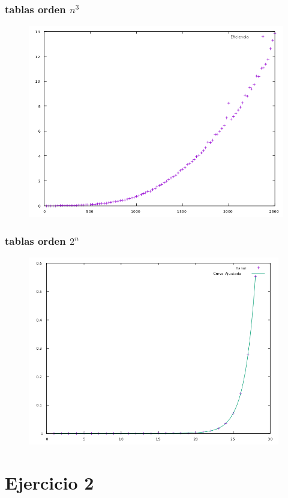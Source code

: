 \documentclass[compress]{beamer}
\begin{document}
\begin{frame}
\frametitle{tablas orden $n^3$}
	\begin{figure}
  \centering
    \includegraphics[width=1\textwidth]{Floyd.png}
  \label{fig:ejemplo}
\end{figure}
\end{frame}
\begin{frame}
\frametitle{tablas orden $2^n$}
	\begin{figure}
  \centering
    \includegraphics[width=0.98\textwidth]{HanoiAjustada.png}
  \label{fig:ejemplo}
\end{figure}
\end{frame}

\section{Ejercicio 2}
\end{document}
